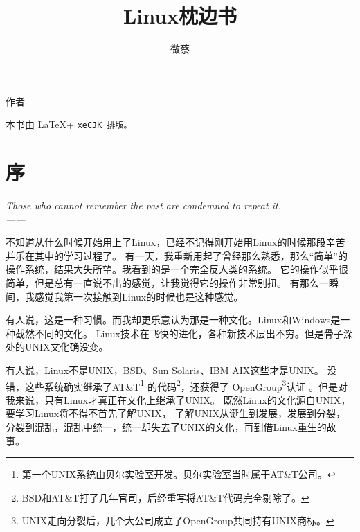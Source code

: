 \documentclass[amstex]{ctexbook}
\title{Linux枕边书}
\author{微蔡}
\newenvironment{quotes}[1]{\pushQED{#1}%
\begin{flushright}%
\begin{minipage}{0.5\textwidth}\begin{flushright}\noindent\it}{%
 \\------\popQED{}\end{flushright}\end{minipage}\end{flushright}}%
\begin{document}

\thispagestyle{empty}

\makeatletter

\begin{center}

\begin{Huge}
\xingkai{} \@title
\end{Huge}

\vskip 5cm

作者 \@author

本书由 \LaTeX + \tt{xeCJK} 排版。

\end{center}

\makeatother 
\setcounter{page}{0}

 
\tableofcontents


\chapter{序}
\begin{quotes}{George Santayana}
Those who cannot remember the past are condemned to repeat it.
\end{quotes}


不知道从什么时候开始用上了Linux，已经不记得刚开始用Linux的时候那段辛苦并乐在其中的学习过程了。
有一天，我重新用起了曾经那么熟悉，那么“简单”的操作系统，结果大失所望。我看到的是一个完全反人类的系统。
它的操作似乎很简单，但是总有一直说不出的感觉，让我觉得它的操作非常别扭。
有那么一瞬间，我感觉我第一次接触到Linux的时候也是这种感觉。

有人说，这是一种习惯。而我却更乐意认为那是一种文化。Linux和Windows是一种截然不同的文化。
Linux技术在飞快的进化，各种新技术层出不穷。但是骨子深处的UNIX文化确没变。

有人说，Linux不是UNIX，BSD、Sun Solaris、IBM AIX这些才是UNIX。
没错，这些系统确实继承了AT\&T\footnote{第一个UNIX系统由贝尔实验室开发。贝尔实验室当时属于AT\&T公司。}
的代码\footnote{BSD和AT\&T打了几年官司，后经重写将AT\&T代码完全剔除了。}，还获得了
OpenGroup\footnote{UNIX走向分裂后，几个大公司成立了OpenGroup共同持有UNIX商标。}认证
。但是对我来说，只有Linux才真正在文化上继承了UNIX。
既然Linux的文化源自UNIX，要学习Linux将不得不首先了解UNIX，
了解UNIX从诞生到发展，发展到分裂，分裂到混乱，混乱中统一，统一却失去了UNIX的文化，再到借Linux重生的故事。
\end{document}
